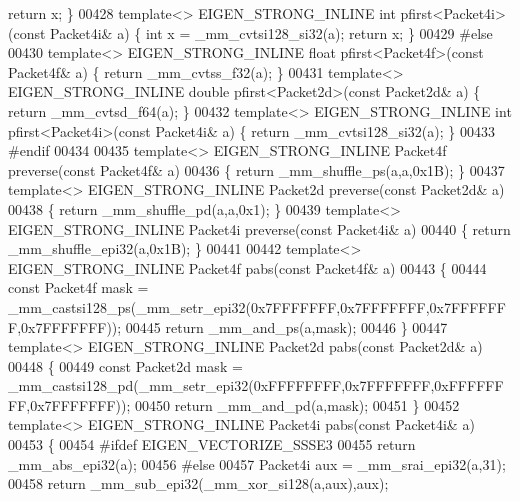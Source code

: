 \begin{DoxyCode}
{      return} x; \}
00428 \textcolor{keyword}{template}<> EIGEN\_STRONG\_INLINE \textcolor{keywordtype}{int}    pfirst<Packet4i>(\textcolor{keyword}{const} Packet4i& a) \{ \textcolor{keywordtype}{int} x = \_mm\_cvtsi128\_si32(a); \textcolor{keywordflow}{
      return} x; \}
00429 \textcolor{preprocessor}{#else}
00430 \textcolor{keyword}{template}<> EIGEN\_STRONG\_INLINE \textcolor{keywordtype}{float}  pfirst<Packet4f>(\textcolor{keyword}{const} Packet4f& a) \{ \textcolor{keywordflow}{return} \_mm\_cvtss\_f32(a); \}
00431 \textcolor{keyword}{template}<> EIGEN\_STRONG\_INLINE \textcolor{keywordtype}{double} pfirst<Packet2d>(\textcolor{keyword}{const} Packet2d& a) \{ \textcolor{keywordflow}{return} \_mm\_cvtsd\_f64(a); \}
00432 \textcolor{keyword}{template}<> EIGEN\_STRONG\_INLINE \textcolor{keywordtype}{int}    pfirst<Packet4i>(\textcolor{keyword}{const} Packet4i& a) \{ \textcolor{keywordflow}{return} \_mm\_cvtsi128\_si32(a); \}
00433 \textcolor{preprocessor}{#endif}
00434 
00435 \textcolor{keyword}{template}<> EIGEN\_STRONG\_INLINE Packet4f preverse(\textcolor{keyword}{const} Packet4f& a)
00436 \{ \textcolor{keywordflow}{return} \_mm\_shuffle\_ps(a,a,0x1B); \}
00437 \textcolor{keyword}{template}<> EIGEN\_STRONG\_INLINE Packet2d preverse(\textcolor{keyword}{const} Packet2d& a)
00438 \{ \textcolor{keywordflow}{return} \_mm\_shuffle\_pd(a,a,0x1); \}
00439 \textcolor{keyword}{template}<> EIGEN\_STRONG\_INLINE Packet4i preverse(\textcolor{keyword}{const} Packet4i& a)
00440 \{ \textcolor{keywordflow}{return} \_mm\_shuffle\_epi32(a,0x1B); \}
00441 
00442 \textcolor{keyword}{template}<> EIGEN\_STRONG\_INLINE Packet4f pabs(\textcolor{keyword}{const} Packet4f& a)
00443 \{
00444   \textcolor{keyword}{const} Packet4f mask = \_mm\_castsi128\_ps(\_mm\_setr\_epi32(0x7FFFFFFF,0x7FFFFFFF,0x7FFFFFFF,0x7FFFFFFF));
00445   \textcolor{keywordflow}{return} \_mm\_and\_ps(a,mask);
00446 \}
00447 \textcolor{keyword}{template}<> EIGEN\_STRONG\_INLINE Packet2d pabs(\textcolor{keyword}{const} Packet2d& a)
00448 \{
00449   \textcolor{keyword}{const} Packet2d mask = \_mm\_castsi128\_pd(\_mm\_setr\_epi32(0xFFFFFFFF,0x7FFFFFFF,0xFFFFFFFF,0x7FFFFFFF));
00450   \textcolor{keywordflow}{return} \_mm\_and\_pd(a,mask);
00451 \}
00452 \textcolor{keyword}{template}<> EIGEN\_STRONG\_INLINE Packet4i pabs(\textcolor{keyword}{const} Packet4i& a)
00453 \{
00454 \textcolor{preprocessor}{  #ifdef EIGEN\_VECTORIZE\_SSSE3}
00455   \textcolor{keywordflow}{return} \_mm\_abs\_epi32(a);
00456 \textcolor{preprocessor}{  #else}
00457   Packet4i aux = \_mm\_srai\_epi32(a,31);
00458   \textcolor{keywordflow}{return} \_mm\_sub\_epi32(\_mm\_xor\_si128(a,aux),aux);

\end{DoxyCode}
